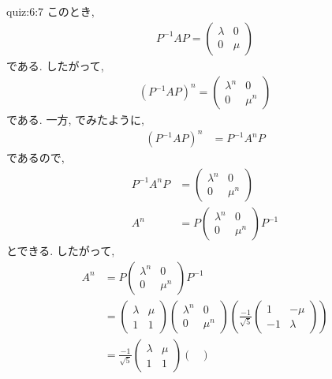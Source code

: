 \begin{answerof}{quiz:6:7}
このとき,
\begin{align*}
  P^{-1}AP=
  \begin{pmatrix}
    \lambda&0\\
    0&\mu
  \end{pmatrix}
\end{align*}
である.
したがって,
\begin{align*}
  (P^{-1}AP)^n=
  \begin{pmatrix}
    \lambda^n&0\\
    0&\mu^n
  \end{pmatrix}
\end{align*}
である.
一方, でみたように,
\begin{align*}
  (P^{-1}AP)^n
  &=P^{-1}A^nP
\end{align*}
であるので,
\begin{align*}
P^{-1}A^nP&=
  \begin{pmatrix}
    \lambda^n&0\\
    0&\mu^n
  \end{pmatrix}
\\
A^n&=
P
  \begin{pmatrix}
    \lambda^n&0\\
    0&\mu^n
  \end{pmatrix}
  P^{-1}
\end{align*}
とできる.
したがって,
\begin{align*}
  A^n
  &=
P
  \begin{pmatrix}
    \lambda^n&0\\
    0&\mu^n
  \end{pmatrix}
  P^{-1}\\
&=
  \begin{pmatrix}
    \lambda&\mu\\
    1&1    
  \end{pmatrix}
  \begin{pmatrix}
    \lambda^n&0\\
    0&\mu^n
  \end{pmatrix}
(  \frac{-1}{\sqrt{5}}
  \begin{pmatrix}
    1&-\mu\\
    -1&\lambda    
  \end{pmatrix}
)\\
&=\frac{-1}{\sqrt{5}}
  \begin{pmatrix}
    \lambda&\mu\\
    1&1    
  \end{pmatrix}
  \begin{pmatrix}

\end{pmatrix}
\end{align*}
\end{answerof}

